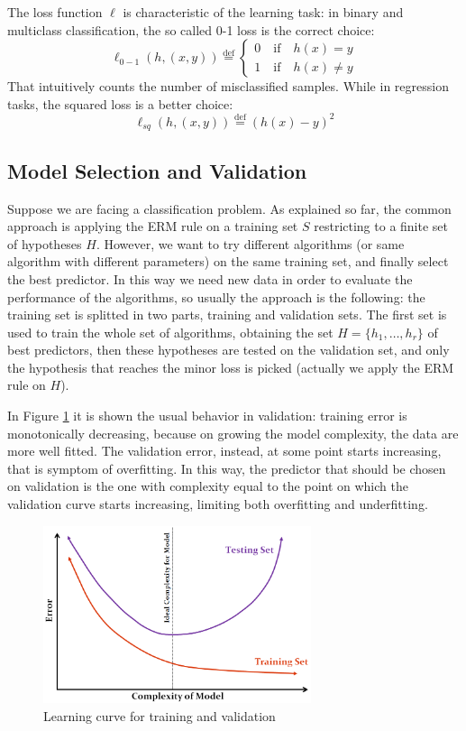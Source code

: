 The loss function $\ell$ is characteristic of the learning task: in binary and multiclass classification, the so called 0-1 loss is the correct choice:
\[\ell_{0-1}(h, (x,y)) \stackrel{\text{def}}{=} 
	\begin{cases}
		0 \quad \textrm{if} \quad  h(x) = y\\
		1 \quad \textrm{if} \quad  h(x) \neq y
	\end{cases}\]
That intuitively counts the number of misclassified samples. While in regression tasks, the squared loss is a better choice:
\[\ell_{sq}(h,(x,y)) \stackrel{\text{def}}{=} (h(x)-y)^2\]




\subsection{Model Selection and Validation}
Suppose we are facing a classification problem. As explained so far, the common approach is applying the ERM rule on a training set $S$ restricting to a finite set of hypotheses $H$. However, we want to try different algorithms (or same algorithm with different parameters) on the same training set, and finally select the best predictor. In this way we need new data in order to evaluate the performance of the algorithms, so usually the approach is the following: the training set is splitted in two parts, training and validation sets. The first set is used to train the whole set of algorithms, obtaining the set $H = \{h_1, \dots, h_r\}$ of best predictors, then these hypotheses are tested on the validation set, and only the hypothesis that reaches the minor loss is picked (actually we apply the ERM rule on $H$).

In Figure \ref{fig:valid-curve} it is shown the usual behavior in validation: training error is monotonically decreasing, because on growing the model complexity, the data are more well fitted. The validation error, instead, at some point starts increasing, that is symptom of overfitting. In this way, the predictor that should be chosen on validation is the one with complexity equal to the point on which the validation curve starts increasing, limiting both overfitting and underfitting.
\begin{figure}
	\centering
	\includegraphics[width=0.7\textwidth]{figures/validation-lern-curve.png}
	\caption{Learning curve for training and validation}
	\label{fig:valid-curve}
\end{figure}

